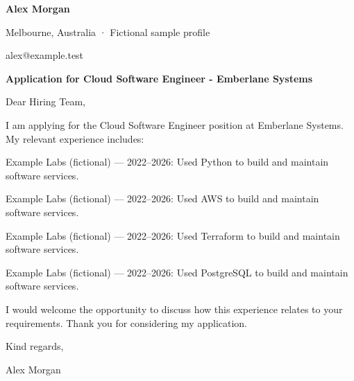 \documentclass[10pt,a4paper]{article}
\begin{document}
{\LARGE\bfseries\color{navy} Alex Morgan}\par
Melbourne, Australia · Fictional sample profile\par
alex@example.test\par
{\large\bfseries\color{navy} Application for Cloud Software Engineer - Emberlane Systems}\par
Dear Hiring Team,\par
I am applying for the Cloud Software Engineer position at Emberlane Systems. My relevant experience includes:\par
Example Labs (fictional) — 2022–2026: Used Python to build and maintain software services.\par
Example Labs (fictional) — 2022–2026: Used AWS to build and maintain software services.\par
Example Labs (fictional) — 2022–2026: Used Terraform to build and maintain software services.\par
Example Labs (fictional) — 2022–2026: Used PostgreSQL to build and maintain software services.\par
I would welcome the opportunity to discuss how this experience relates to your requirements. Thank you for considering my application.\par
Kind regards,\par
Alex Morgan\par
\end{document}

